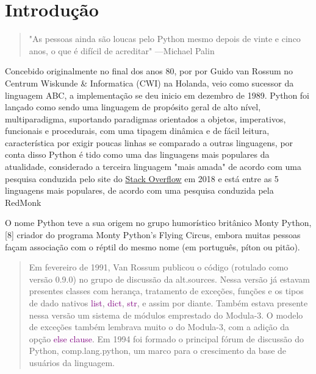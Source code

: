 


\chapter{ Introdu\c{c}\~{a}o}

\begin{quote}
"As pessoas ainda são loucas pelo Python mesmo depois de vinte e cinco anos,
o que é difícil de acreditar"
—Michael Palin
\end{quote}

Concebido originalmente no final dos anos 80, por por Guido van Rossum no Centrum Wiskunde \& Informatica (CWI) na Holanda, veio como sucessor da linguagem ABC, a implementação se deu inicio em dezembro de 1989. Python foi lançado como sendo uma linguagem de propósito geral de alto nível, multiparadigma, suportando paradigmas orientados a objetos, imperativos, funcionais e procedurais, com uma tipagem dinâmica e de fácil leitura, característica por exigir poucas linhas se comparado a outras linguagens, por conta disso Python é tido como uma das linguagens mais populares da atualidade, considerado a terceira linguagem "mais amada" de acordo com uma pesquisa conduzida pelo site do \href{https://stackoverflow.com/}{Stack Overflow} em 2018 e está entre as 5 linguagens mais populares, de acordo com uma pesquisa conduzida pela RedMonk 

O nome Python teve a sua origem no grupo humorístico britânico Monty Python,[8] criador do programa Monty Python's Flying Circus, embora muitas pessoas façam associação com o réptil do mesmo nome (em português, píton ou pitão).

\begin{quote}
  Em fevereiro de 1991, Van Rossum publicou o código (rotulado como versão 0.9.0) no grupo de discussão da alt.sources. Nessa versão já estavam presentes classes com herança, tratamento de exceções, funções e os tipos de dado nativos \textcolor{purple}{list}, \textcolor{purple}{dict}, \textcolor{purple}{str}, e assim por diante. Também estava presente nessa versão um sistema de módulos emprestado do Modula-3. O modelo de exceções também lembrava muito o do Modula-3, com a adição da opção \textcolor{purple}{else clause}.
  Em 1994 foi formado o principal fórum de discussão do Python, comp.lang.python, um marco para o crescimento da base de usuários da linguagem. \cite{Int01}
\end{quote}

